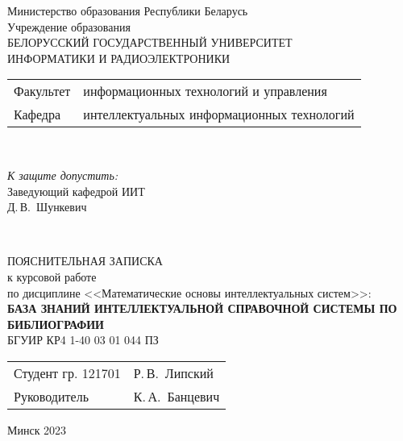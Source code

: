 \begin{titlepage}
  \begin{center}
    Министерство образования Республики Беларусь\\[1em]
    Учреждение образования\\
    БЕЛОРУССКИЙ ГОСУДАРСТВЕННЫЙ УНИВЕРСИТЕТ \\
    ИНФОРМАТИКИ И РАДИОЭЛЕКТРОНИКИ\\[1em]

    \begin{minipage}{\textwidth}
      \begin{flushleft}
        \begin{tabular}{ l l }
          Факультет & информационных технологий и управления\\
          Кафедра   & интеллектуальных информационных технологий
        \end{tabular}
      \end{flushleft}
    \end{minipage}\\[1em]

    \begin{flushright}
      \begin{minipage}{0.4\textwidth}
        \textit{К защите допустить:}\\[0.8em]
        Заведующий кафедрой ИИТ\\[0.45em]
        \underline{\hspace*{2.8cm}} Д.\,В.~Шункевич
      \end{minipage}\\[2.2em]
    \end{flushright}

    {ПОЯСНИТЕЛЬНАЯ ЗАПИСКА}\\
    {к курсовой работе}\\
    {по дисциплине <<Математические основы интеллектуальных систем>>:}\\[1em]
    \textbf{\large БАЗА ЗНАНИЙ ИНТЕЛЛЕКТУАЛЬНОЙ СПРАВОЧНОЙ СИСТЕМЫ ПО БИБЛИОГРАФИИ}\\[1em]


    {БГУИР КР4 1-40 03 01 044 ПЗ}\\[2em]
    \vspace{2em}
    \begin{tabular}{ p{}p{} }
      Студент гр. 121701 & Р.\,В.~Липский \\
      Руководитель & К.\,А.~Банцевич \\
    \end{tabular}
    
    \vfill
    {\normalsize Минск 2023}
  \end{center}
\end{titlepage}

